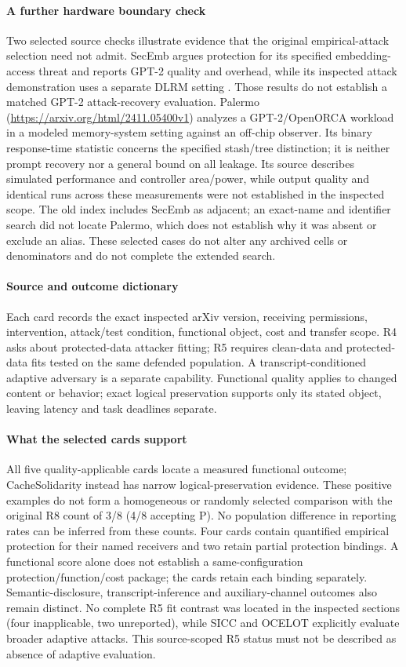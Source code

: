 \paragraph{A further hardware boundary check}
Two selected source checks illustrate evidence that the original empirical-attack selection need not admit. SecEmb argues protection for its specified embedding-access threat and reports GPT-2 quality and overhead, while its inspected attack demonstration uses a separate DLRM setting \cite[III--VI]{umar2025secemb}. Those results do not establish a matched GPT-2 attack-recovery evaluation. Palermo (\url{https://arxiv.org/html/2411.05400v1}) analyzes a GPT-2/OpenORCA workload in a modeled memory-system setting against an off-chip observer. Its binary response-time statistic concerns the specified stash/tree distinction; it is neither prompt recovery nor a general bound on all leakage. Its source describes simulated performance and controller area/power, while output quality and identical runs across these measurements were not established in the inspected scope. The old index includes SecEmb as adjacent; an exact-name and identifier search did not locate Palermo, which does not establish why it was absent or exclude an alias. These selected cases do not alter any archived cells or denominators and do not complete the extended search.

\paragraph{Source and outcome dictionary}
Each card records the exact inspected arXiv version, receiving permissions, intervention, attack/test condition, functional object, cost and transfer scope. R4 asks about protected-data attacker fitting; R5 requires clean-data and protected-data fits tested on the same defended population. A transcript-conditioned adaptive adversary is a separate capability. Functional quality applies to changed content or behavior; exact logical preservation supports only its stated object, leaving latency and task deadlines separate.

\paragraph{What the selected cards support}
All five quality-applicable cards locate a measured functional outcome; CacheSolidarity instead has narrow logical-preservation evidence. These positive examples do not form a homogeneous or randomly selected comparison with the original R8 count of 3/8 (4/8 accepting P). No population difference in reporting rates can be inferred from these counts. Four cards contain quantified empirical protection for their named receivers and two retain partial protection bindings. A functional score alone does not establish a same-configuration protection/function/cost package; the cards retain each binding separately. Semantic-disclosure, transcript-inference and auxiliary-channel outcomes also remain distinct. No complete R5 fit contrast was located in the inspected sections (four inapplicable, two unreported), while SICC and OCELOT explicitly evaluate broader adaptive attacks. This source-scoped R5 status must not be described as absence of adaptive evaluation.

